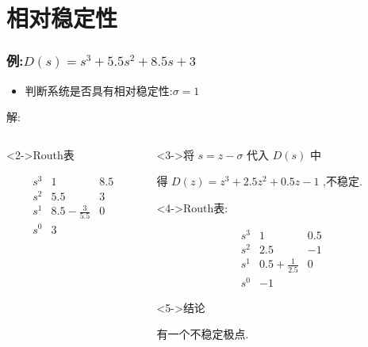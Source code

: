 \documentclass{beamer}
\begin{document}
\section{相对稳定性}
\label{sec-6}
\begin{frame}
\frametitle{例:$D(s)=s^{3}+5.5s^{2}+8.5s+3$}
\label{sec-6-1}

\begin{itemize}
\item 判断系统是否具有相对稳定性:$\sigma=1$
\end{itemize}

解:
\begin{columns}
\begin{column}{0.3\textwidth}
\begin{block}<2->{Routh表}
\label{sec-6-1-1}

\[
\begin{matrix}
s^{3} & 1 &  8.5 \\
s^{2} & 5.5  & 3 \\
s^{1} & 8.5-\frac{3}{5.5} & 0 \\
s^{0} & 3
\end{matrix}
\]
\end{block}
\end{column}
\begin{column}{0.7\textwidth}
\begin{block}<3->{将 $s=z-\sigma$ 代入 $D(s)$ 中}
\label{sec-6-1-2}

得 $D(z)=z^{3}+2.5z^{2}+0.5z-1$ ,不稳定.
\begin{block}<4->{Routh表:}
\label{sec-6-1-2-1}



\[
\begin{matrix}
s^{3} & 1 &  0.5 \\
s^{2} & 2.5  & -1 \\
s^{1} & 0.5+\frac{1}{2.5} & 0 \\
s^{0} & -1
\end{matrix}
\]
\end{block}
\begin{block}<5->{结论}
\label{sec-6-1-2-2}

有一个不稳定极点.
\end{block}
\end{block}
\end{column}
\end{columns}
\end{frame}
\end{document}
